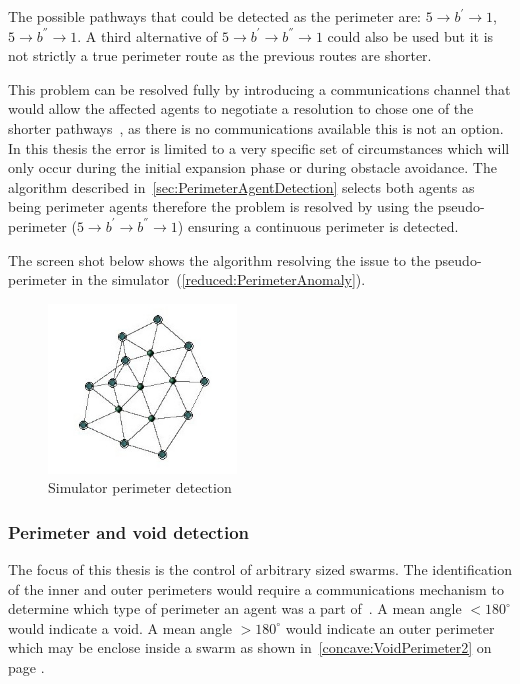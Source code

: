 The possible pathways that could be detected as the perimeter are: $5 \rightarrow b^{'} \rightarrow 1$, $5 \rightarrow b^{''} \rightarrow 1$. A third alternative of $5 \rightarrow b^{'} \rightarrow b^{''} \rightarrow 1$ could also be used but it is not strictly a true perimeter route as the previous routes are shorter.  

This problem can be resolved fully by introducing a communications channel that would allow the affected agents to negotiate a resolution to chose one of the shorter pathways~\cite{MD:09}, as there is no communications available this is not an option. In this thesis the error is limited to a very specific set of circumstances which will only occur during the initial expansion phase or during obstacle avoidance. The algorithm described in~\autoref{sec:PerimeterAgentDetection} selects both agents as being perimeter agents therefore the problem is resolved by using the pseudo-perimeter ($5 \rightarrow b^{'} \rightarrow b^{''} \rightarrow 1$) ensuring a continuous perimeter is detected. 

The screen shot below shows the algorithm resolving the issue to the pseudo-perimeter in the simulator~(\autoref{reduced:PerimeterAnomaly}).

\begin{figure}[H]
\begin{center}
\includegraphics[width=5cm]{CHAPTER-6/figures/PerimeterAnomaly}
\end{center}
\caption{Simulator perimeter detection\label{reduced:PerimeterAnomaly}}
\end{figure}

\subsubsection{Perimeter and void detection}\label{sec:PerimeterVoidDetection} 
The focus of this thesis is the control of arbitrary sized swarms. The identification of the inner and outer perimeters would require a communications mechanism to determine which type of perimeter an agent was a part of~\cite{ZAPS:07,MD:09}. A mean angle $< 180^\circ$ would indicate a void. A mean angle $> 180^\circ$ would indicate an outer perimeter which may be enclose inside a swarm as shown in~\autoref{concave:VoidPerimeter2} on page \pageref{concave:VoidPerimeter2}.  

